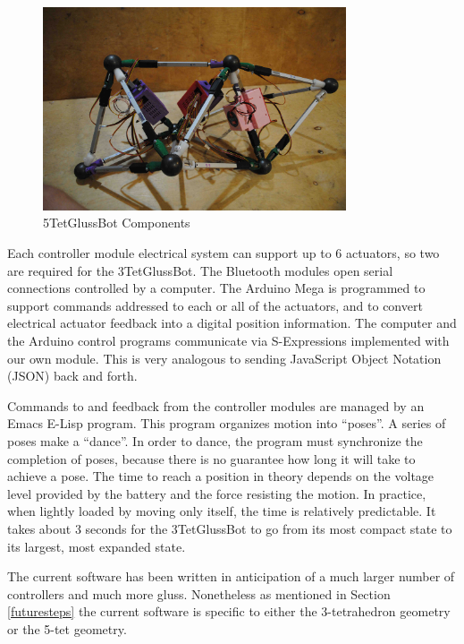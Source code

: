 \documentclass[11pt]{article}
\begin{document}
\begin{figure}[!ht]
  \centering
    \includegraphics[width=0.8\textwidth]{figureslowres/5TegGlussBotOverview.jpg}
    \caption[5TetGlussBot Components]{5TetGlussBot Components}
      \label{5TetGlussBot}
\end{figure}


Each controller module electrical system can support up to 6 actuators, so two are required for the 3TetGlussBot.
The Bluetooth modules open serial connections controlled by a computer.
The Arduino Mega is programmed to support commands addressed to each or all of the actuators, and
to convert electrical actuator feedback into a digital position information.
The computer and the Arduino control programs communicate via S-Expressions
implemented with our own module. This is very analogous to sending JavaScript Object Notation (JSON) back and forth.

Commands to and feedback from the controller modules are managed by an Emacs E-Lisp program.
This program organizes motion into ``poses''. A series of poses make a ``dance''.
In order to dance, the program must synchronize the completion of poses, because there is no
guarantee how long it will take to achieve a pose. The time to reach a position in theory
depends on the voltage level provided by the battery and the force resisting the motion.
In practice, when lightly loaded by moving only itself, the time is relatively predictable. It takes
about 3 seconds for the 3TetGlussBot to go from its most compact state to its largest, most expanded state.

The current software has been written in anticipation of a much larger number of controllers and much more gluss.
Nonetheless as mentioned in Section \ref{futuresteps} the current software is specific to either the 3-tetrahedron geometry or the
5-tet geometry.
\end{document}
